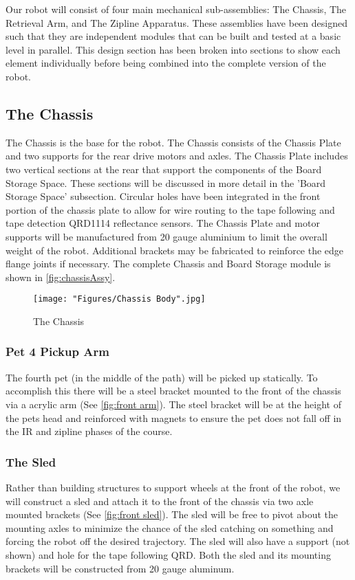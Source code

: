 \documentclass[11pt, oneside]{article} %
\begin{document}
Our robot will consist of four main mechanical sub-assemblies: The Chassis, The Retrieval Arm, and The Zipline Apparatus. These assemblies have been designed such that they are independent modules that can be built and tested at a basic level in parallel. This design section has been broken into sections to show each element individually before being combined into the complete version of the robot.

	\subsection{The Chassis}

	The Chassis is the base for the robot. The Chassis consists of the Chassis Plate and two supports for the rear drive motors and axles. The Chassis Plate includes two vertical sections at the rear that support the components of the Board Storage Space. These sections will be discussed in more detail in the 'Board Storage Space' subsection. Circular holes have been integrated in the front portion of the chassis plate to allow for wire routing to the tape following and tape detection QRD1114 reflectance sensors. The Chassis Plate and motor supports will be manufactured from 20 gauge aluminium to limit the overall weight of the robot. Additional brackets may be fabricated to reinforce the edge flange joints if necessary. The complete Chassis and Board Storage module is shown in \autoref{fig:chassisAssy}.

	\begin{figure}[h]
		\centering
		\texttt{[image: "Figures/Chassis Body".jpg]}
		\caption[Chassis]{The Chassis}
		\label{fig:1}
	\end{figure}

		\subsubsection{Pet 4 Pickup Arm}
		The fourth pet (in the middle of the path) will be picked up statically. To accomplish this there will be a steel bracket mounted to the front of the chassis via a acrylic arm (See \autoref{fig:front arm}). The steel bracket will be at the height of the pets head and reinforced with magnets to ensure the pet does not fall off in the IR and zipline phases of the course.
	
		\subsubsection{The Sled}
		Rather than building structures to support wheels at the front of the robot, we will construct a sled and attach it to the front of the chassis via two axle mounted brackets (See \autoref{fig:front sled}). The sled will be free to pivot about the mounting axles to minimize the chance of the sled catching on something and forcing the robot off the desired trajectory. The sled will also have a support (not shown) and hole for the tape following QRD. Both the sled and its mounting brackets will be constructed from 20 gauge aluminum.
		
\end{document}
